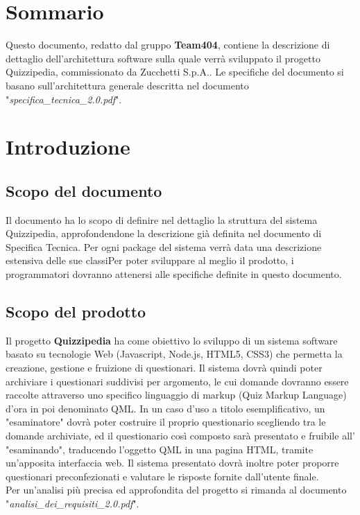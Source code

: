 \documentclass[a4paper,11pt]{article}
\begin{document}
	\section*{Sommario}
	Questo documento, redatto dal gruppo \textbf{Team404}, contiene la descrizione di dettaglio dell'architettura software sulla quale verrà sviluppato il progetto Quizzipedia, commissionato da Zucchetti S.p.A..
Le specifiche del documento si basano sull'architettura generale descritta nel documento "\textit{specifica\_tecnica\_2.0.pdf}".
	
	\newpage
	\section{Introduzione}
	\subsection{Scopo del documento}
	Il documento ha lo scopo di definire nel dettaglio la struttura del sistema Quizzipedia, approfondendone la descrizione già definita nel documento di Specifica Tecnica. Per ogni package del sistema verrà data una descrizione estensiva delle sue classiPer poter sviluppare al meglio il prodotto, i programmatori dovranno attenersi alle specifiche definite in questo documento.
	
	\subsection{Scopo del prodotto}
	Il progetto \textbf{Quizzipedia} ha come obiettivo lo sviluppo di un sistema software basato su tecnologie Web (Javascript\addglos, Node.js\addglos, HTML5\addglos, CSS3\addglos) che permetta la creazione, gestione e fruizione di questionari. Il sistema dovrà quindi poter archiviare i questionari suddivisi per argomento, le cui domande dovranno essere raccolte attraverso uno specifico linguaggio di markup (Quiz Markup Language) d'ora in poi denominato QML\addglos. In un caso d'uso a titolo esemplificativo, un "esaminatore" dovrà poter costruire il proprio questionario scegliendo tra le domande archiviate, ed il questionario così composto sarà presentato e fruibile all' "esaminando", traducendo l'oggetto QML in una pagina HTML\addglos, tramite un'apposita interfaccia web. Il sistema presentato dovrà inoltre poter proporre questionari preconfezionati e valutare le risposte fornite dall'utente finale.
	\\
	Per un'analisi più precisa ed approfondita del progetto si rimanda al documento\\ "\textit{analisi\_dei\_requisiti\_2.0.pdf}".
\end{document}
